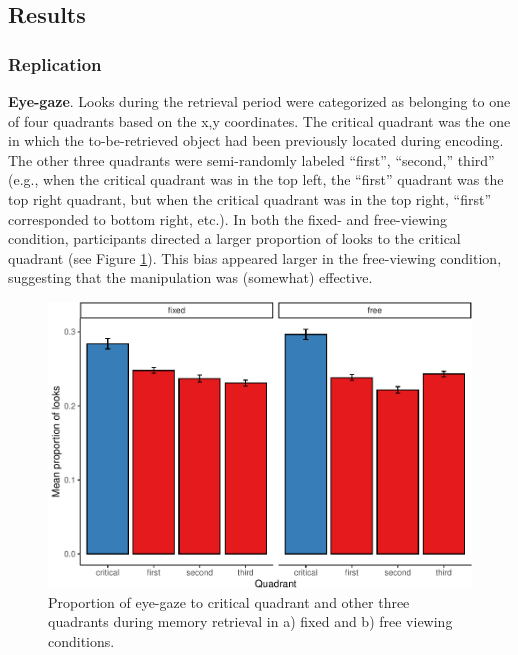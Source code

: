 \documentclass[
  man,floatsintext]{apa6}
\begin{document}
\hypertarget{results-1}{%
\subsection{Results}\label{results-1}}

\hypertarget{replication-1}{%
\subsubsection{Replication}\label{replication-1}}

\textbf{Eye-gaze}. Looks during the retrieval period were categorized as belonging to one of four quadrants based on the x,y coordinates. The critical quadrant was the one in which the to-be-retrieved object had been previously located during encoding. The other three quadrants were semi-randomly labeled ``first'', ``second,'' third'' (e.g., when the critical quadrant was in the top left, the ``first'' quadrant was the top right quadrant, but when the critical quadrant was in the top right, ``first'' corresponded to bottom right, etc.). In both the fixed- and free-viewing condition, participants directed a larger proportion of looks to the critical quadrant (see Figure \ref{fig:E2-gaze-fig-both-conds}). This bias appeared larger in the free-viewing condition, suggesting that the manipulation was (somewhat) effective.

\begin{figure}
\centering
\includegraphics{manuscript_files/figure-latex/E2-gaze-fig-both-conds-1.pdf}
\caption{\label{fig:E2-gaze-fig-both-conds}Proportion of eye-gaze to critical quadrant and other three quadrants during memory retrieval in a) fixed and b) free viewing conditions.}
\end{figure}
\end{document}
